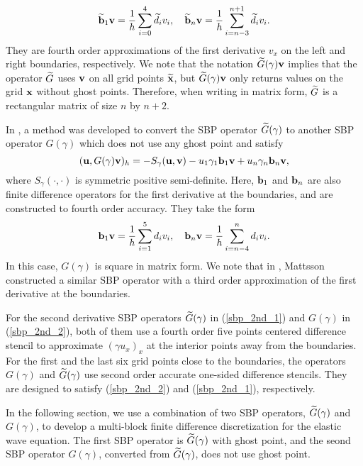 \begin{equation}\label{sbp_1st_1}
\wt{\bf b}_1 {\bf v} = \frac{1}{h}\sum_{i=0}^{4} \wt{d}_i v_i, \quad\wt{\bf b}_n {\bf v} = \frac{1}{h}\sum_{i=n-3}^{n+1} \wt{d}_i v_i.
\end{equation}
They are fourth order approximations of the first derivative $v_x$ on the left and right boundaries, respectively. We note that the notation $\widetilde{G}(\gamma){\bf v}$ implies that the operator $\widetilde{G}$ uses ${\bf v}$ on all grid points $\widetilde{\bf x}$, but $\widetilde{G}(\gamma){\bf v}$ only returns values on the grid ${\bf x}$ without ghost points. Therefore, when writing in matrix form, $\widetilde{G}$ is a rectangular matrix of size $n$ by $n+2$.

 In \cite{wang2018fourth}, a method was developed to convert the SBP operator $\widetilde{G}(\gamma)$ to another SBP operator $G(\gamma)$ which does not use any ghost point and satisfy
 \begin{equation}\label{sbp_2nd_2}
 ({\bf u}, G(\gamma){\bf v})_h = -S_\gamma({\bf u},{\bf v})-u_1\gamma_1{\bf b}_1{\bf v} + u_n\gamma_n{\bf b}_n{\bf v},
 \end{equation}
 where $S_\gamma(\cdot,\cdot)$ is symmetric positive semi-definite. 
 Here, ${\bf b}_1$ and ${\bf b}_n$ are also finite difference operators for the first derivative at the boundaries, and are constructed to fourth order accuracy. They take the form
 \begin{equation}\label{sbp_1st_2}
 {\bf b}_1 {\bf v} = \frac{1}{h}\sum_{i=1}^{5} d_i v_i,\quad {\bf b}_n {\bf v} = \frac{1}{h}\sum_{i=n-4}^{n} d_i v_i.
 \end{equation}
   In this case, ${G}(\gamma)$ is square in matrix form. We note that in  \cite{Mattsson2012}, Mattsson constructed a similar SBP operator with a third order approximation of the first derivative at the boundaries.  %
 
For the second derivative SBP operators $\widetilde{G}(\gamma)$ in (\ref{sbp_2nd_1}) and $G(\gamma)$ in (\ref{sbp_2nd_2}), both of them use a fourth order five points centered difference stencil to approximate $(\gamma u_x)_x$ at the interior points away from the boundaries. For the first and the last six grid points close to the boundaries, the operators $G(\gamma)$ and $\widetilde{G}(\gamma)$ use second order accurate one-sided difference stencils. They are designed to satisfy (\ref{sbp_2nd_2}) and (\ref{sbp_2nd_1}), respectively.

In the following section, we use a combination of two SBP operators, $\widetilde{G}(\gamma)$ and $G(\gamma)$, to develop a multi-block finite difference discretization for the elastic wave equation. The first SBP operator is $\widetilde{G}(\gamma)$ with ghost point, and the seond SBP operator $G(\gamma)$, converted from $\widetilde{G}(\gamma)$, does not use ghost point.
